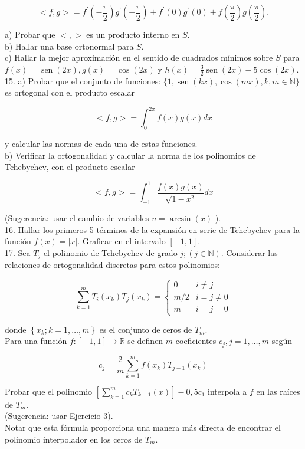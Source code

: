 \documentclass[10pt]{book}
\begin{document}
$$
<f, g>=f^{\prime}\left(-\frac{\pi}{2}\right) g^{\prime}\left(-\frac{\pi}{2}\right)+f^{\prime}(0) g^{\prime}(0)+f\left(\frac{\pi}{2}\right) g\left(\frac{\pi}{2}\right) .
$$

a) Probar que $<,>$ es un producto interno en $S$.\\
b) Hallar una base ortonormal para $S$.\\
c) Hallar la mejor aproximación en el sentido de cuadrados mínimos sobre $S$ para $f(x)=\operatorname{sen}(2 x), g(x)=\cos (2 x)$ y $h(x)=\frac{3}{2} \operatorname{sen}(2 x)-5 \cos (2 x)$.\\
15. a) Probar que el conjunto de funciones: $\{1, \operatorname{sen}(k x), \cos (m x), k, m \in \mathbb{N}\}$ es ortogonal con el producto escalar

$$
<f, g>=\int_{0}^{2 \pi} f(x) g(x) d x
$$

y calcular las normas de cada una de estas funciones.\\
b) Verificar la ortogonalidad y calcular la norma de los polinomios de Tchebychev, con el producto escalar

$$
<f, g>=\int_{-1}^{1} \frac{f(x) g(x)}{\sqrt{1-x^{2}}} d x
$$

(Sugerencia: usar el cambio de variables $u=\arcsin (x)$ ).\\
16. Hallar los primeros 5 términos de la expansión en serie de Tchebychev para la función $f(x)=|x|$. Graficar en el intervalo $[-1,1]$.\\
17. Sea $T_{j}$ el polinomio de Tchebychev de grado $j ;(j \in \mathbb{N})$. Considerar las relaciones de ortogonalidad discretas para estos polinomios:

$$
\sum_{k=1}^{m} T_{i}\left(x_{k}\right) T_{j}\left(x_{k}\right)= \begin{cases}0 & i \neq j \\ m / 2 & i=j \neq 0 \\ m & i=j=0\end{cases}
$$

donde $\left\{x_{k} ; k=1, \ldots, m\right\}$ es el conjunto de ceros de $T_{m}$.\\
Para una función $f:[-1,1] \rightarrow \mathbb{R}$ se definen $m$ coeficientes $c_{j}, j=1, \ldots, m$ según

$$
c_{j}=\frac{2}{m} \sum_{k=1}^{m} f\left(x_{k}\right) T_{j-1}\left(x_{k}\right)
$$

Probar que el polinomio $\left[\sum_{k=1}^{m} c_{k} T_{k-1}(x)\right]-0,5 c_{1}$ interpola a $f$ en las raíces de $T_{m}$.\\
(Sugerencia: usar Ejercicio 3).\\
Notar que esta fórmula proporciona una manera más directa de encontrar el polinomio interpolador en los ceros de $T_{m}$.
\end{document}
